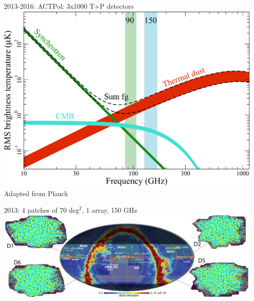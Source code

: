 \documentclass[table]{beamer}
\begin{document}
\begin{frame}{2013-2016: ACTPol: 3x1000 T+P detectors}
	\centering
	\includegraphics[width=\textwidth]{actpol_freqs.pdf}\\
	\footnotesize{Adapted from Planck}
\end{frame}
\begin{frame}{2013: 4 patches of 70 deg${}^2$, 1 array, 150 GHz}
	\centering
	\hspace*{-1cm}\includegraphics[width=1.15\textwidth]{actpol_2013_patches.pdf}
\end{frame}
\end{document}

